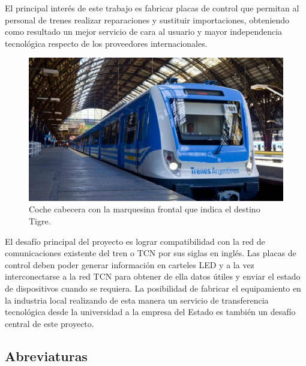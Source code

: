\documentclass[
11pt, %
]{charter}
\begin{document}
El principal interés de este trabajo es fabricar placas de control que permitan al personal de trenes realizar reparaciones y sustituir importaciones, obteniendo como resultado un mejor servicio de cara al usuario y mayor independencia tecnológica respecto de los proveedores internacionales.\\

\begin{figure}[htpb]
\centering 
\includegraphics[width=.75\textwidth]{./Pics/tren.jpg}
\caption{Coche cabecera con la marquesina frontal que indica el destino Tigre.}
\label{fig:cartelFrente}
\end{figure}


El desafío principal del proyecto es lograr  compatibilidad con la red de comunicaciones existente del tren o TCN por sus siglas en inglés. Las placas de control deben poder generar información en carteles LED y a la vez interconectarse a la red TCN para obtener de ella datos útiles y enviar el estado de dispositivos cuando se requiera. La posibilidad de fabricar el equipamiento en la industria local realizando de esta manera un servicio de transferencia tecnológica desde la universidad a la empresa del Estado es también un desafío central de este proyecto.
\pagebreak

\subsection{Abreviaturas}
\label{sec:abreviaturas}
\end{document}

